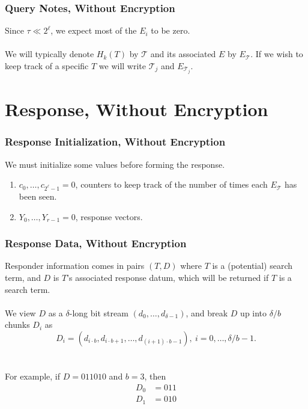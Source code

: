 \documentclass{beamer}
\makeatletter
\DeclareRobustCommand*{\&}{%
  \nfss@text{%
    \fontfamily{LinuxBiolinumT-TLF}%
    \selectfont
    \symbol{`\&}%
  }%
}
\makeatother
\begin{document}
\begin{frame}
  \frametitle{Query Notes, Without Encryption}
  Since $\tau \ll 2^\ell$, we expect most of the $E_i$ to be zero.\\~\\
  We will typically denote $H_k(T)$ by $\mathcal{T}$ and its associated $E$ by
  $E_\mathcal{T}$. If we wish to keep track of a specific $T$ we will write
  $\mathcal{T}_j$ and $E_{\mathcal{T}_j}$.
\end{frame}

\section{Response, Without Encryption}
\begin{frame}
  \frametitle{Response Initialization, Without Encryption}
  We must initialize some values before forming the response.
  \begin{enumerate}
    \item $c_0,\ldots,c_{2^\ell - 1} = 0$, counters to keep track of the number
      of times each $E_\mathcal{T}$ has been seen.
    \item $Y_0,\ldots,Y_{r-1} = 0$, response vectors.
  \end{enumerate}
\end{frame}

\begin{frame}
  \frametitle{Response Data, Without Encryption}
  Responder information comes in pairs $(T, D)$ where $T$ is a (potential)
  search term, and $D$ is $T$'s associated response datum, which will be
  returned if $T$ is a search term.\\~\\

  We view $D$ as a $\delta$-long bit stream $(d_0,\ldots,d_{\delta-1})$, and
  break $D$ up into $\delta/b$ chunks $D_i$ as 
  \begin{equation*}
    D_i = (d_{i\cdot b}, d_{i\cdot b+1},\ldots,d_{(i+1)\cdot b-1}),\ i=0,\ldots,\delta/b-1.
  \end{equation*}\\~\\
  For example, if $D=011010$ and $b=3$, then
  \begin{align*}
    D_0 &= 011\\
    D_1 &= 010
  \end{align*}
\end{frame}
\end{document}
